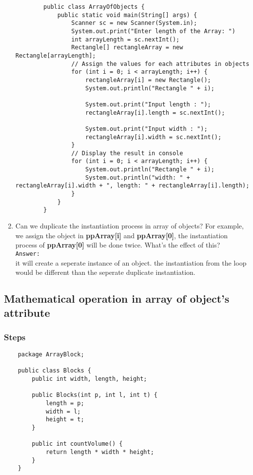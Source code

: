 \documentclass[12pt,titlepage]{article}
\begin{document}
\begin{enumerate}
\begin{verbatim}
        public class ArrayOfObjects {
            public static void main(String[] args) {
                Scanner sc = new Scanner(System.in);
                System.out.print("Enter length of the Array: ")
                int arrayLength = sc.nextInt();
                Rectangle[] rectangleArray = new Rectangle[arrayLength];
                // Assign the values for each attributes in objects
                for (int i = 0; i < arrayLength; i++) {
                    rectangleArray[i] = new Rectangle();
                    System.out.println("Rectangle " + i);

                    System.out.print("Input length : ");
                    rectangleArray[i].length = sc.nextInt();

                    System.out.print("Input width : ");
                    rectangleArray[i].width = sc.nextInt();
                }
                // Display the result in console
                for (int i = 0; i < arrayLength; i++) {
                    System.out.println("Rectangle " + i);
                    System.out.println("width: " + rectangleArray[i].width + ", length: " + rectangleArray[i].length);
                }
            }
        }
    \end{verbatim}
    \item Can we duplicate the instantiation process in array of objects? For example, we assign the object in \textbf{ppArray[i]} and \textbf{ppArray[0]}, the instantiation process of \textbf{ppArray[0]} will be done twice. What’s the effect of this?
    \mbox{}\\ \texttt{Answer:}
    \mbox{}\\ it will create a seperate instance of an object. the instantiation from the loop would be different than the seperate duplicate instantiation. 
\end{enumerate}

\subsection{Mathematical operation in array of object’s attribute}

\subsubsection{Steps}

\begin{verbatim}
    package ArrayBlock;

    public class Blocks {
        public int width, length, height;

        public Blocks(int p, int l, int t) {
            length = p;
            width = l;
            height = t;
        }

        public int countVolume() {
            return length * width * height;
        }
    }
\end{verbatim}
\end{document}
